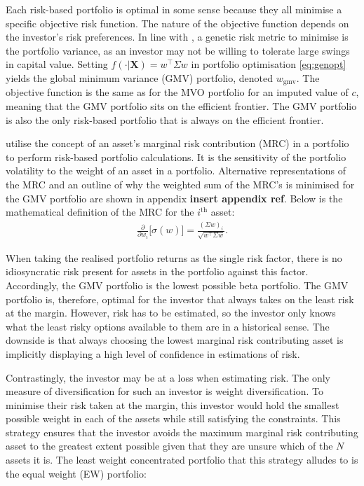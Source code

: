 \documentclass[
]{article}
\begin{document}
Each risk-based portfolio is optimal in some sense because they all minimise a specific objective risk
function. The nature of the objective function depends on the investor's risk preferences. In line
with \citet{M52}, a genetic risk metric to minimise is the portfolio variance, as an investor may not be
willing to tolerate large swings in capital value. Setting
\(f(\cdot|\textbf{X}) = w^\intercal \Sigma w\) in portfolio optimisation \eqref{eq:genopt} yields the
global minimum variance (GMV) portfolio, denoted \(w_\textrm{gmv}\). The objective function is the same
as for the MVO portfolio for an imputed value of \(c\), meaning that the GMV portfolio sits on the
efficient frontier. The GMV portfolio is also the only risk-based portfolio that is always on the
efficient frontier.

\citet{MRT10} utilise the concept of an asset's marginal risk contribution (MRC) in a portfolio to perform
risk-based portfolio calculations. It is the sensitivity of the portfolio volatility to the weight of
an asset in a portfolio. Alternative representations of the MRC and an outline of why the weighted sum
of the MRC's is minimised for the GMV portfolio are shown in appendix \textbf{insert appendix ref}. Below
is the mathematical definition of the MRC for the \(i^{\mathrm{th}}\) asset:
\begin{align}
\frac{\partial}{\partial w_i} \Big [ \sigma(w) \Big ]= \frac{(\Sigma w)_i}{\sqrt{w^\intercal \Sigma w}}.
\end{align}

When taking the realised portfolio returns as the single risk factor, there is no idiosyncratic risk
present for assets in the portfolio against this factor. Accordingly, the GMV portfolio is the lowest
possible beta portfolio. The GMV portfolio is, therefore, optimal for the investor that always takes
on the least risk at the margin. However, risk has to be estimated, so the investor only knows what
the least risky options available to them are in a historical sense. The downside is that always
choosing the lowest marginal risk contributing asset is implicitly displaying a high level of
confidence in estimations of risk.

Contrastingly, the investor may be at a loss when estimating risk. The only measure of diversification
for such an investor is weight diversification. To minimise their risk taken at the margin, this
investor would hold the smallest possible weight in each of the assets while still satisfying the
constraints. This strategy ensures that the investor avoids the maximum marginal risk contributing
asset to the greatest extent possible given that they are unsure which of the \(N\) assets it is. The
least weight concentrated portfolio that this strategy alludes to is the equal weight (EW) portfolio:
\end{document}

